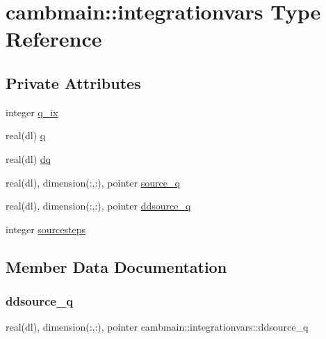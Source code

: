 \hypertarget{structcambmain_1_1integrationvars}{}\section{cambmain\+:\+:integrationvars Type Reference}
\label{structcambmain_1_1integrationvars}
\subsection*{Private Attributes}
\begin{DoxyCompactItemize}
\item 
integer \mbox{\hyperlink{structcambmain_1_1integrationvars_a3c84209538b1a16195cdb217c272bcac}{q\+\_\+ix}}
\item 
real(dl) \mbox{\hyperlink{structcambmain_1_1integrationvars_a808507164bfbde14be991b7702a0acf3}{q}}
\item 
real(dl) \mbox{\hyperlink{structcambmain_1_1integrationvars_ad54dc9f2f7f36057602e96b7a7ba90fd}{dq}}
\item 
real(dl), dimension(\+:,\+:), pointer \mbox{\hyperlink{structcambmain_1_1integrationvars_a1efdc4ae40485da5b2cf5ce45f48530e}{source\+\_\+q}}
\item 
real(dl), dimension(\+:,\+:), pointer \mbox{\hyperlink{structcambmain_1_1integrationvars_ac404b399f1735db6f5a3b9b30eefd23a}{ddsource\+\_\+q}}
\item 
integer \mbox{\hyperlink{structcambmain_1_1integrationvars_a06fdc06801d7c47d381d6ac39998d2f4}{sourcesteps}}
\end{DoxyCompactItemize}


\subsection{Member Data Documentation}
\mbox{\label{structcambmain_1_1integrationvars_ac404b399f1735db6f5a3b9b30eefd23a}} 
\subsubsection{\texorpdfstring{ddsource\+\_\+q}{ddsource\_q}}
{\footnotesize\ttfamily real(dl), dimension(\+:,\+:), pointer cambmain\+::integrationvars\+::ddsource\+\_\+q\hspace{0.3cm}{\ttfamily [private]}}

